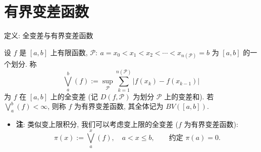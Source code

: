 
\section[全变差]{有界变差函数}


\begin{frame}{定义: 全变差与有界变差函数}

\begin{Def}
设 $f$ 是 $[a, b]$ 上有限函数,
$\mathscr{P}:\ a = x_0 < x_1 < x_2 < \cdots < x_{n(\mathscr{P})} = b$
为 $[a, b]$ 的一个划分. 称
\[
\bigvee_a^b (f) := \sup_{\mathscr{P}} \sum_{k=1}^{n(\mathscr{P})}
\big| f(x_k) - f(x_{k-1}) \big|
\]
为 $f$ 在 $[a, b]$ 上的\alert{全变差} (记 $D(f, \mathscr{P})$ 为划分 $\mathscr{P}$ 上的变差和).
若 $\bigvee_a^b (f) < \infty$, 则称 $f$ 为\alert{有界变差函数}, 其全体记为 $BV([a, b])$.
\end{Def}

\pause

\begin{itemize}
\item \textbf{注}: 类似变上限积分, 我们可以考虑\alert{变上限的全变差}
  ($f$ 为有界变差函数):
\[
\pi(x) := \bigvee_a^x (f), \quad a < x \leqslant b, \qquad \text{约定 } \pi(a) = 0 .
\]
\end{itemize}

\end{frame}



